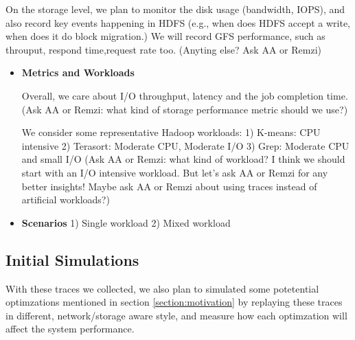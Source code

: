 On the storage level, we plan to monitor the disk usage (bandwidth, IOPS), and also record key events happening in HDFS (e.g., when does HDFS accept a write, when does it do block migration.) We will record GFS performance, such as throuput, respond time,request rate too. (Anyting else? Ask AA or Remzi)


\begin{itemize}
	\item {\bf Metrics and Workloads}

Overall, we care about I/O throughput, latency and the job completion time. (Ask AA or Remzi: what kind of storage performance metric should we use?)

We consider some representative Hadoop workloads:
1) K-means: CPU intensive
2) Terasort: Moderate CPU, Moderate I/O
3) Grep: Moderate CPU and small I/O
(Ask AA or Remzi: what kind of workload? I think we should start with an I/O intensive workload. But let's ask AA or Remzi for any better insights! Maybe ask AA or Remzi about using traces instead of artificial workloads?)
	
	\item {\bf Scenarios}
1) Single workload
2) Mixed workload

\end{itemize}

\subsection{\bf Initial Simulations}
With these traces we collected, we also plan to simulated some potetential optimzations mentioned in section \ref{section:motivation} by replaying these traces in different, network/storage aware style, and measure how each optimzation will affect the system performance.

\usepackage{comment}
\begin{comment}
After analyzing traces, we expect to come up with some heuristics and conduct initial simulations to demonstrate the benefits of network-aware storage. Some of the heuristics we have in mind now are:
I think we listed potential optimzations in motivation section, so don't need to repeat here.
1) When reading blocks, if the data locality cannot be met, rather than randomly schedule a map task with the nearest input replica, we could choose a map task with the replica which it could fetch most quickly. When writing blocks, rather than randomly place a replica on a node in remote rack, we may also take how congested the link is into consideration when choosing the replica location/path to the destination.
2) Put off HDFS block writes. We may put off HDFS writes of some replicas of a block when some links are heavy loaded.
\end{comment}

